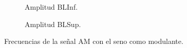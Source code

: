       \begin{figure}[H]
        \centering
        \begin{subfigure}[H]{0.48\textwidth}
          \caption{Amplitud BLInf.}
          \label{fig:AmplitudBLInfAMSeno}
        \end{subfigure}
        \hfill 
        \begin{subfigure}[H]{0.48\textwidth}
          \caption{Amplitud BLSup.}
          \label{fig:AmpltiudBLSupAMSeno}
        \end{subfigure}
      
        \caption{Frecuencias de la señal AM con el seno como modulante.}
        \label{fig:AmplitudesAMSeno}
      \end{figure}

